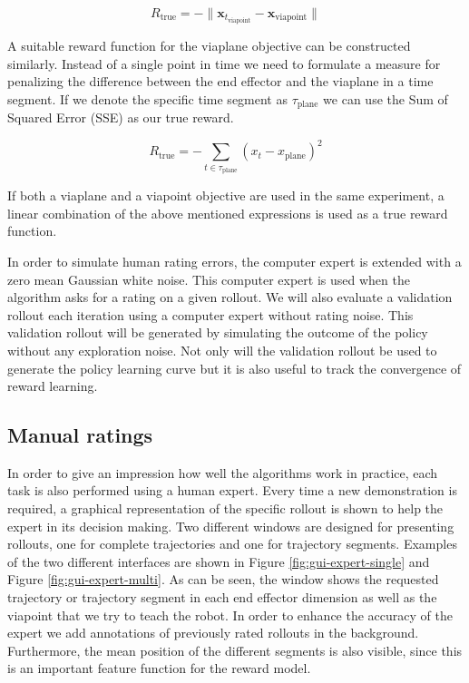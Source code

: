 \documentclass[mscThesis.tex]{subfiles}
\begin{document}
\begin{equation*}
    R_{\text{true}} = - \| \bm{x}_{t_{\text{viapoint}}} -\bm{x}_{\text{viapoint}} \|
\end{equation*}

A suitable reward function for the viaplane objective can be constructed similarly. Instead of a single point in time we need to formulate a measure for penalizing the difference between the end effector and the viaplane in a time segment. If we denote the specific time segment as $\tau_{\text{plane}}$ we can use the Sum of Squared Error (SSE) as our true reward.

\begin{equation*}
    R_{\text{true}} = - \sum_{t \in \tau_{\text{plane}}} \left( x_{t} -x_{\text{plane}} \right)^2
\end{equation*}

If both a viaplane and a viapoint objective are used in the same experiment, a linear combination of the above mentioned expressions is used as a true reward function. 

In order to simulate human rating errors, the computer expert is extended with a zero mean Gaussian white noise. This computer expert is used when the algorithm asks for a rating on a given rollout. We will also evaluate a validation rollout each iteration using a computer expert without rating noise. This validation rollout will be generated by simulating the outcome of the policy without any exploration noise. Not only will the validation rollout be used to generate the policy learning curve but it is also useful to track the convergence of reward learning.

\subsection{Manual ratings}
In order to give an impression how well the algorithms work in practice, each task is also performed using a human expert. Every time a new demonstration is required, a graphical representation of the specific rollout is shown to help the expert in its decision making. Two different windows are designed for presenting rollouts, one for complete trajectories and one for trajectory segments. Examples of the two different interfaces are shown in Figure \ref{fig:gui-expert-single} and Figure \ref{fig:gui-expert-multi}. As can be seen, the window shows the requested trajectory or trajectory segment in each end effector dimension as well as the viapoint that we try to teach the robot. In order to enhance the accuracy of the expert we add annotations of previously rated rollouts in the background. Furthermore, the mean position of the different segments is also visible, since this is an important feature function for the reward model.
\end{document}
